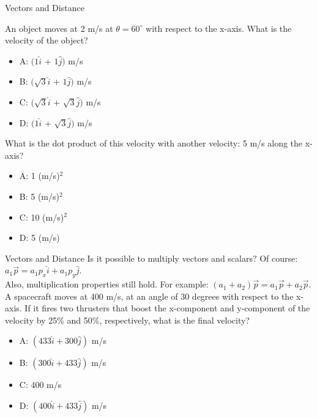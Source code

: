 \documentclass{beamer}
\begin{document}
\begin{frame}{Vectors and Distance}
\small
\begin{minipage}[b]{0.45\linewidth}
An object moves at 2 m/s at $\theta = 60^{\circ}$ with respect to the x-axis.  What is the velocity of the object?
\vspace{0.2cm}
\begin{itemize}
\item A: $(1\hat{i}$ + $1\hat{j})$  m/s
\item B: $(\sqrt{3}\hat{i}$ + $1\hat{j})$  m/s
\item C: $(\sqrt{3}\hat{i}$ + $\sqrt{3}\hat{j})$  m/s
\item D: $(1\hat{i}$ + $\sqrt{3}\hat{j})$  m/s
\end{itemize}
\end{minipage}
\hspace{0.5cm}
\begin{minipage}[b]{0.45\linewidth}
What is the dot product of this velocity with another velocity: 5 m/s along the x-axis?
\vspace{0.7cm}
\begin{itemize}
\item A: 1 (m/s)$^2$
\item B: 5 (m/s)$^2$
\item C: 10 (m/s)$^2$
\item D: 5 (m/s)
\end{itemize}
\end{minipage}
\end{frame}

\begin{frame}{Vectors and Distance}
Is it possible to multiply vectors and scalars?  Of course: $a_1\vec{p} = a_1p_x\hat{i}+a_1p_y\hat{j}$.\\
\vspace{0.2cm}
Also, multiplication properties still hold.  For example: $(a_1+a_2)\vec{p} = a_1\vec{p}+a_2\vec{p}$. \\
\vspace{0.2cm}
\small
A spacecraft moves at 400 m/s, at an angle of 30 degrees with respect to the x-axis.  If it fires two thrusters that boost the x-component and y-component of the velocity by 25\% and 50\%, respectively, what is the final velocity?
\begin{itemize}
\item A: $(433\hat{i}+300\hat{j})$ m/s
\item B: $(300\hat{i}+433\hat{j})$ m/s
\item C: 400 m/s
\item D: $(400\hat{i}+433\hat{j})$ m/s
\end{itemize}
\end{frame}
\end{document}
